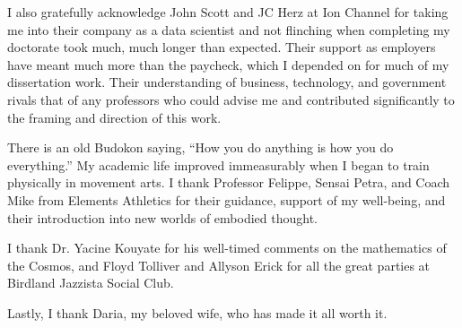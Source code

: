 \documentclass[../thesis.tex]{subfiles}
\begin{document}
 I also gratefully acknowledge John Scott and JC Herz
 at Ion Channel
 for taking me into their company as a data scientist and
 not flinching when completing my doctorate took much,
 much longer than expected.
 Their support as employers have meant much more than the paycheck,
 which I depended on for much of my dissertation work.
 Their understanding of business, technology, and government
 rivals that of any professors who could advise me
 and contributed significantly to the framing and direction
 of this work.

 There is an old Budokon saying, ``How you do anything
 is how you do everything.''
 My academic life improved immeasurably when I began
 to train physically in movement arts.
 I thank Professor Felippe, Sensai Petra, and Coach Mike
 from Elements Athletics for their guidance,
 support of my well-being, and their introduction
 into new worlds of embodied thought.

 I thank Dr. Yacine Kouyate for his well-timed
 comments on the mathematics of the Cosmos, and Floyd Tolliver
 and Allyson Erick for all the great parties at
 Birdland Jazzista Social Club.
 
 Lastly, I thank Daria, my beloved wife,
 who has made it all worth it.
\end{document}
